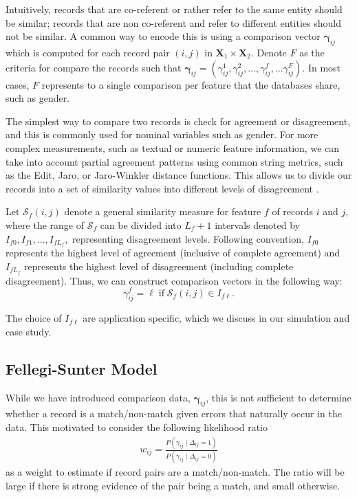 \documentclass[12pt,letterpaper]{article}
\newcommand{\1}[1]{\mathbb{I}\!\left[#1\right]} %
\begin{document}
{Intuitively, records that are co-referent or rather refer to the same entity should be similar; records that are non co-referent and refer to different entities should not be similar. A common way to encode this is using a comparison vector $\bm{\gamma}_{ij}$ which is computed for each record pair $(i,j)$ in $\bm{X}_1 \times \bm{X}_2.$ Denote $F$ as the criteria for compare the records such that 
$\bm{\gamma}_{ij} = (\gamma_{ij}^1, \gamma_{ij}^2, \ldots, \gamma_{ij}^f, \ldots \gamma_{ij}^F).$ In most cases, $F$ represents to a single comparison per feature that the databases share, such as gender. 

The simplest way to compare two records is check for agreement or disagreement, and this is commonly used for nominal variables such as gender. For more complex measurements, such as textual or numeric feature information, we can take into account partial agreement patterns using common string metrics, such as the Edit, Jaro, or Jaro-Winkler distance functions. This allows us to divide our records into a set of similarity values into different levels of disagreement \citep{bilenko2006riddle, elmagarmid_duplicate_2007}.

Let $\mathcal{S}_f(i,j)$ denote a general similarity measure for feature $f$ of records $i$ and $j,$ where the range of $\mathcal{S}_f$ can be divided into $L_f +1$ intervals denoted by $I_{f0}, I_{f1}, \ldots, I_{fL_f},$ representing disagreement levels. Following convention, $I_{f0}$ represents the highest level of agreement (inclusive of complete agreement) and $I_{fL_f}$ represents the highest level of disagreement (including complete disagreement). Thus, we can construct comparison vectors in the following way: 
$$\gamma_{ij}^f = \ell \; \text{if} \; \mathcal{S}_f(i,j) \in I_{f\ell}.$$

The choice of $I_{f\ell}$ are application specific, which we discuss in our simulation and case study. 


\subsection{Fellegi-Sunter Model}
While we have introduced comparison data, $\bm{\gamma}_{ij}$, this is not sufficient to determine whether a record is a match/non-match given errors that naturally occur in the data. This motivated \cite{fellegi_theory_1969} to consider the following likelihood ratio
\begin{align}
	\label{eqn:wts}
	w_{ij} = \frac{P(\gamma_{ij} \mid \Delta_{ij} = 1)}{P(\gamma_{ij} \mid \Delta_{ij} = 0)}
\end{align}
as a weight to estimate if record pairs are a match/non-match. The ratio will be large if there is strong evidence of the pair being a match, and small otherwise. 

}
\end{document}
